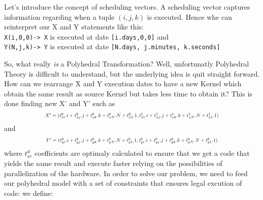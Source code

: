 \documentclass[10pt, a4paper, twocolumn]{paper}
\newcommand*{\Scale}[2][4]{\scalebox{#1}{$#2$}}
\begin{document}
Let's introduce the concept of scheduling vectors. A scheduling vector captures information regarding when a tuple  $(i,j,k)$ is executed. Hence whe can reinterpret  our X and Y statements like this:\\
\verb!X(i,0,0)-> X! is executed at date \verb![i.days,0,0]! and \\
\verb!Y(N,j,k)-> Y! is executed at date \verb![N.days, j.minutes, k.seconds]!


So, what really \emph{is} a Polyhedral Transformation?
Well, unfortunatly Polyhedral Theory is difficult to understand, but the underlying idea is quit straight forward. How can we rearrange X and Y execution dates to have a new Kernel which obtain the same result as source Kernel but takes less time to obtain it?
This is done finding new X' and Y' such as
\[\Scale[0.7]{X'=(t^0_{xi}.i+t^0_{xj}.j+t^0_{xk}.k+t^0_{xN}.N+t^0_{x1}.1,\\t^1_{xi}.i+t^1_{xj}.j+t^1_{xk}.k+t^1_{xN}.N+t^1_{x1}.1)}\] and
\[\Scale[0.7]{Y'=(t^0_{yi}.i+t^0_{yj}.j+t^0_{yk}.k+t^0_{yN}.N+t^0_{y1}.1,t^0_{yi}.i+t^0_{yj}.j+t^0_{yk}.k+t^0_{yN}.N+t^0_{y1}.1)}\]
where $t^d_{sr}$ coefficients are optimaly calculated to ensure that we get a code that yields the same result and execute faster relying on the possibilities of parallelization of the hardware.
In order to solve our problem, we need to feed our polyhedral model with a set of constraints that ensures legal excution of code:
we define:

\nocite{*}


\end{document}
